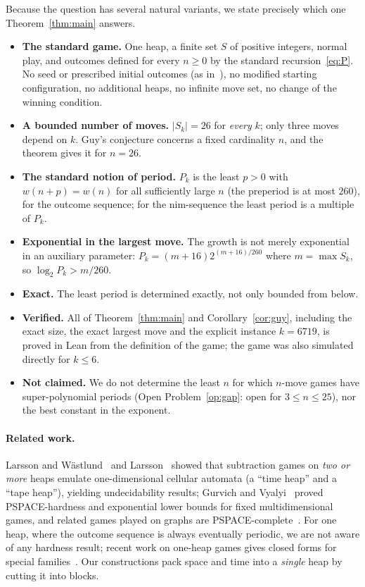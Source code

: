 \documentclass[11pt]{article}
\theoremstyle{definition}
\newcommand{\nmoves}{26}
\begin{document}
Because the question has several natural variants, we state precisely which one Theorem~\ref{thm:main}
answers.
\begin{itemize}[leftmargin=*]
\item \textbf{The standard game.}  One heap, a finite set $S$ of positive integers, normal play, and
outcomes defined for every $n\ge0$ by the standard recursion~\eqref{eq:P}.  No seed or prescribed
initial outcomes (as in~\cite{MP}), no modified starting configuration, no additional heaps, no
infinite move set, no change of the winning condition.
\item \textbf{A bounded number of moves.}  $|S_k|=\nmoves$ for \emph{every} $k$; only three moves depend on
$k$.  Guy's conjecture concerns a fixed cardinality $n$, and the theorem gives it for $n=\nmoves$.
\item \textbf{The standard notion of period.}  $P_k$ is the least $p>0$ with $w(n+p)=w(n)$ for all
sufficiently large $n$ (the preperiod is at most $260$), for the outcome sequence; for the
nim-sequence the least period is a multiple of $P_k$.
\item \textbf{Exponential in the largest move.}  The growth is not merely exponential in an auxiliary
parameter: $P_k=(m+16)2^{(m+16)/260}$ where $m=\max S_k$, so $\log_2 P_k> m/260$.
\item \textbf{Exact.}  The least period is determined exactly, not only bounded from below.
\item \textbf{Verified.}  All of Theorem~\ref{thm:main} and Corollary~\ref{cor:guy}, including the exact
size, the exact largest move and the explicit instance $k=6719$, is proved in Lean from the definition
of the game; the game was also simulated directly for $k\le 6$.
\item \textbf{Not claimed.}  We do not determine the least $n$ for which $n$-move games have
super-polynomial periods (Open Problem~\ref{op:gap}: open for $3\le n\le 25$), nor the best
constant in the exponent.
\end{itemize}

\paragraph{Related work.}  Larsson and Wästlund~\cite{LW} and Larsson~\cite{L12} showed that
subtraction games on \emph{two or more} heaps emulate one-dimensional cellular automata (a ``time
heap'' and a ``tape heap''), yielding undecidability results; Gurvich and Vyalyi~\cite{GV} proved
PSPACE-hardness and exponential lower bounds for fixed multidimensional games, and related games
played on graphs are PSPACE-complete~\cite{DGPS}.  For one heap, where the outcome sequence is always
eventually periodic, we are not aware of any hardness result; recent work on one-heap games gives
closed forms for special families~\cite{LM,LS}.  Our constructions pack space and time into a
\emph{single} heap by cutting it into blocks.
\end{document}

